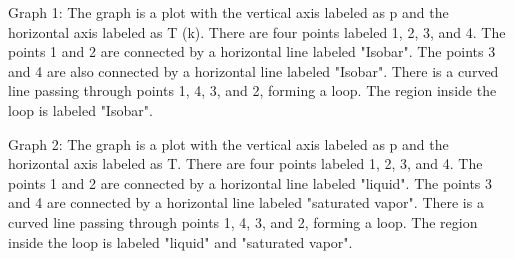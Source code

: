Graph 1: The graph is a plot with the vertical axis labeled as p and the horizontal axis labeled as T (k). There are four points labeled 1, 2, 3, and 4. The points 1 and 2 are connected by a horizontal line labeled "Isobar". The points 3 and 4 are also connected by a horizontal line labeled "Isobar". There is a curved line passing through points 1, 4, 3, and 2, forming a loop. The region inside the loop is labeled "Isobar".

Graph 2: The graph is a plot with the vertical axis labeled as p and the horizontal axis labeled as T. There are four points labeled 1, 2, 3, and 4. The points 1 and 2 are connected by a horizontal line labeled "liquid". The points 3 and 4 are connected by a horizontal line labeled "saturated vapor". There is a curved line passing through points 1, 4, 3, and 2, forming a loop. The region inside the loop is labeled "liquid" and "saturated vapor".
